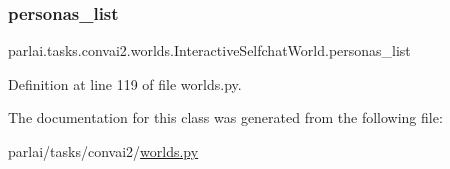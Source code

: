 \subsubsection{\texorpdfstring{personas\+\_\+list}{personas\_list}}
{\footnotesize\ttfamily parlai.\+tasks.\+convai2.\+worlds.\+Interactive\+Selfchat\+World.\+personas\+\_\+list}



Definition at line 119 of file worlds.\+py.



The documentation for this class was generated from the following file\+:\begin{DoxyCompactItemize}
\item 
parlai/tasks/convai2/\hyperlink{parlai_2tasks_2convai2_2worlds_8py}{worlds.\+py}\end{DoxyCompactItemize}
